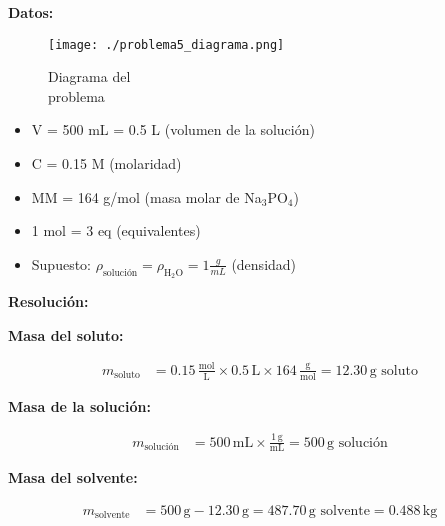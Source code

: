 \documentclass{article}
\begin{document}
\begin{multicols}{2} %
\noindent\textbf{Datos:} %

\begin{figure}[H]
    \begin{minipage}[t]{0.3\textwidth} %
        \raggedright %
        \texttt{[image: ./problema5\_diagrama.png]} %
        \caption{Diagrama del \\ problema}
    \end{minipage}
\end{figure}

\textbf{} %
\begin{itemize}
\item V = 500 mL = 0.5 L (volumen de la solución)
\item C = 0.15 M (molaridad)
\item MM = 164 g/mol (masa molar de Na$_3$PO$_4$)
\item 1 mol = 3 eq (equivalentes)
\item Supuesto: $\rho_{\text{solución}} = \rho_{\text{H}_2\text{O}} = 1 \frac{g}{mL}$ (densidad)
\end{itemize}

\columnbreak %

\noindent\textbf{Resolución:} %

\textbf{Masa del soluto:}

\begin{align*}
    m_{\text{soluto}} &= 0.15 \, \frac{\text{mol}}{\text{L}} \times 0.5 \, \text{L} \times 164 \, \frac{\text{g}}{\text{mol}} = 12.30 \, \text{g soluto}
\end{align*}

\textbf{Masa de la solución:}

\begin{align*}
    m_{\text{solución}} &= 500 \, \text{mL} \times \frac{1 \, \text{g}}{\text{mL}} = 500 \, \text{g solución}
\end{align*}

\textbf{Masa del solvente:}

\begin{align*}
    m_{\text{solvente}} &= 500 \, \text{g} - 12.30 \, \text{g} = 487.70 \, \text{g solvente} = 0.488 \, \text{kg}
\end{align*}


\end{multicols}
\end{document}
